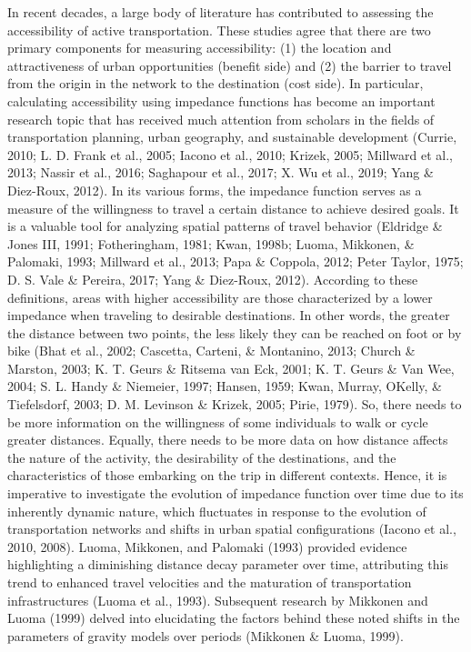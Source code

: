 \documentclass[
11pt, %
oneside, %
english, %
singlespacing, %
]{macthesis} %
\begin{document}
In recent decades, a large body of literature has contributed to assessing the accessibility of active transportation. These studies agree that there are two primary components for measuring accessibility: (1) the location and attractiveness of urban opportunities (benefit side) and (2) the barrier to travel from the origin in the network to the destination (cost side). In particular, calculating accessibility using impedance functions has become an important research topic that has received much attention from scholars in the fields of transportation planning, urban geography, and sustainable development (Currie, 2010; L. D. Frank et al., 2005; Iacono et al., 2010; Krizek, 2005; Millward et al., 2013; Nassir et al., 2016; Saghapour et al., 2017; X. Wu et al., 2019; Yang \& Diez-Roux, 2012). In its various forms, the impedance function serves as a measure of the willingness to travel a certain distance to achieve desired goals. It is a valuable tool for analyzing spatial patterns of travel behavior (Eldridge \& Jones III, 1991; Fotheringham, 1981; Kwan, 1998b; Luoma, Mikkonen, \& Palomaki, 1993; Millward et al., 2013; Papa \& Coppola, 2012; Peter Taylor, 1975; D. S. Vale \& Pereira, 2017; Yang \& Diez-Roux, 2012). According to these definitions, areas with higher accessibility are those characterized by a lower impedance when traveling to desirable destinations. In other words, the greater the distance between two points, the less likely they can be reached on foot or by bike (Bhat et al., 2002; Cascetta, Carteni, \& Montanino, 2013; Church \& Marston, 2003; K. T. Geurs \& Ritsema van Eck, 2001; K. T. Geurs \& Van Wee, 2004; S. L. Handy \& Niemeier, 1997; Hansen, 1959; Kwan, Murray, OKelly, \& Tiefelsdorf, 2003; D. M. Levinson \& Krizek, 2005; Pirie, 1979). So, there needs to be more information on the willingness of some individuals to walk or cycle greater distances. Equally, there needs to be more data on how distance affects the nature of the activity, the desirability of the destinations, and the characteristics of those embarking on the trip in different contexts. Hence, it is imperative to investigate the evolution of impedance function over time due to its inherently dynamic nature, which fluctuates in response to the evolution of transportation networks and shifts in urban spatial configurations (Iacono et al., 2010, 2008). Luoma, Mikkonen, and Palomaki (1993) provided evidence highlighting a diminishing distance decay parameter over time, attributing this trend to enhanced travel velocities and the maturation of transportation infrastructures (Luoma et al., 1993). Subsequent research by Mikkonen and Luoma (1999) delved into elucidating the factors behind these noted shifts in the parameters of gravity models over periods (Mikkonen \& Luoma, 1999).
\end{document}

